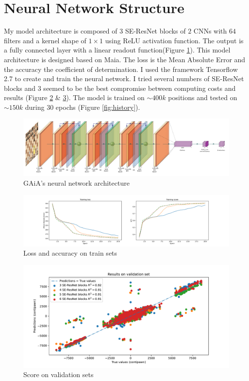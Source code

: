 \documentclass[a4paper]{article}
\begin{document}
\section{Neural Network Structure}
My model architecture is composed of $3$ SE-ResNet blocks of $2$ CNNs with $64$ filters
and a kernel shape of $1\times1$ using ReLU activation function. The output is a
fully connected layer with a linear readout function(Figure \ref{fig:model_archi}).
This model architecture is designed based on Maia\cite{maia}.
The loss is the Mean Absolute Error and the accuracy the coefficient of determination.
I used the framework Tensorflow 2.7 to create and train the neural network.
I tried several numbers of SE-ResNet blocks and $3$ seemed
to be the best compromise between computing costs and results
(Figure \ref{fig:acc_loss} \& \ref{fig:score_valid}).
The model is trained on $\sim 400k$ positions and tested on $\sim 150k$ during 30 epochs (Figure \ref{fig:history}).

\begin{figure}[htp]
  \centering
  \includegraphics[width=13cm]{network/network.pdf}
  \caption{GAiA's neural network architecture}
  \label{fig:model_archi}
\end{figure}

\begin{figure}[H]
  \centering
  \includegraphics[width=15cm]{model_selection_1.pdf}
  \caption{Loss and accuracy on train sets}
  \label{fig:acc_loss}
\end{figure}

\begin{figure}[H]
  \centering
  \includegraphics[width=13cm]{model_selection_2.pdf}
  \caption{Score on validation sets}
  \label{fig:score_valid}
\end{figure}
\end{document}
